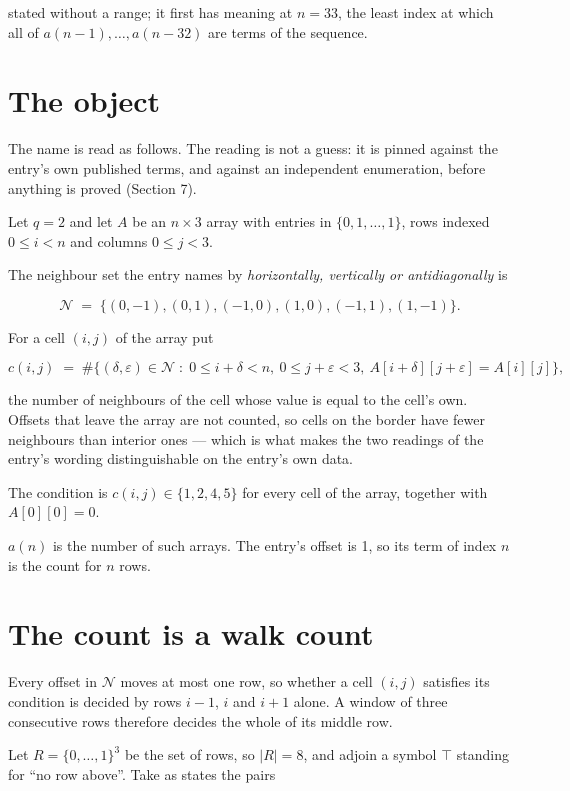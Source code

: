 \documentclass[11pt]{article}
\theoremstyle{definition}
\begin{document}
stated without a range; it first has meaning at $n = 33$, the least index at which all of $a(n-1),\dots,a(n-32)$ are terms of the sequence.

\section{The object}

The name is read as follows. The reading is not a guess: it is pinned against the entry's own published terms, and against an independent enumeration, before anything is proved (Section 7).

Let $q = 2$ and let $A$ be an $n \times 3$ array with entries in $\{0,1,\dots,1\}$, rows indexed $0 \le i < n$ and columns $0 \le j < 3$.

The neighbour set the entry names by {\itshape horizontally, vertically or antidiagonally} is

\[\mathcal{N} \;=\; \{(0,-1), (0,1), (-1,0), (1,0), (-1,1), (1,-1)\}.\]

For a cell $(i,j)$ of the array put

\[c(i,j) \;=\; \#\bigl\{(\delta,\varepsilon)\in\mathcal{N} \;:\; 0\le i+\delta<n,\ 0\le j+\varepsilon<3,\ A[i+\delta][j+\varepsilon] = A[i][j]\bigr\},\]

the number of neighbours of the cell whose value is equal to the cell's own. Offsets that leave the array are not counted, so cells on the border have fewer neighbours than interior ones --- which is what makes the two readings of the entry's wording distinguishable on the entry's own data.

The condition is $c(i,j) \in \{1, 2, 4, 5\}$ for every cell of the array, together with $A[0][0]=0$.

$a(n)$ is the number of such arrays. The entry's offset is 1, so its term of index $n$ is the count for $n$ rows.

\section{The count is a walk count}

Every offset in $\mathcal{N}$ moves at most one row, so whether a cell $(i,j)$ satisfies its condition is decided by rows $i-1$, $i$ and $i+1$ alone. A window of three consecutive rows therefore decides the whole of its middle row.

Let $R = \{0,\dots,1\}^{3}$ be the set of rows, so $|R| = 8$, and adjoin a symbol $\top$ standing for ``no row above''. Take as states the pairs
\end{document}
